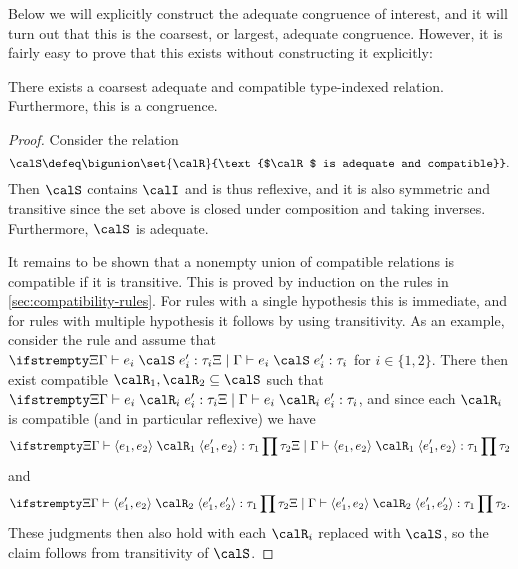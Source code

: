 Below we will explicitly construct the adequate congruence of interest, and it will turn out that this is the coarsest, or largest, adequate congruence. However, it is fairly easy to prove that this exists without constructing it explicitly:

\begin{proposition}
    \label{prop:largest-adequate-congruence}
    There exists a coarsest adequate and compatible type-indexed relation. Furthermore, this is a congruence.
\end{proposition}

\begin{proof}
    Consider the relation
    \begin{equation*}
        \calS
            \defeq \bigunion \set{\calR}{\text{$\calR$ is adequate and compatible}}.
    \end{equation*}
    Then $\calS$ contains $\calI$ and is thus reflexive, and it is also symmetric and transitive since the set above is closed under composition and taking inverses. Furthermore, $\calS$ is adequate.

    It remains to be shown that a nonempty union of compatible relations is compatible if it is transitive. This is proved by induction on the rules in \cref{sec:compatibility-rules}. For rules with a single hypothesis this is immediate, and for rules with multiple hypothesis it follows by using transitivity. As an example, consider the rule  and assume that $\typeindrel{\Xi}{\Gamma}{e_i}{\calS}{e_i'}{\tau_i}$ for $i \in \{1,2\}$. There then exist compatible $\calR_1,\calR_2 \subseteq \calS$ such that $\typeindrel{\Xi}{\Gamma}{e_i}{\calR_i}{e_i'}{\tau_i}$, and since each $\calR_i$ is compatible (and in particular reflexive) we have
    \begin{equation*}
        \typeindrel{\Xi}{\Gamma}{\expPair{e_1}{e_2}}{\calR_1}{\expPair{e_1'}{e_2}}{\typeProd{\tau_1}{\tau_2}}
    \end{equation*}
    and
    \begin{equation*}
        \typeindrel{\Xi}{\Gamma}{\expPair{e_1'}{e_2}}{\calR_2}{\expPair{e_1'}{e_2'}}{\typeProd{\tau_1}{\tau_2}}.
    \end{equation*}
    These judgments then also hold with each $\calR_i$ replaced with $\calS$, so the claim follows from transitivity of $\calS$.
\end{proof}


